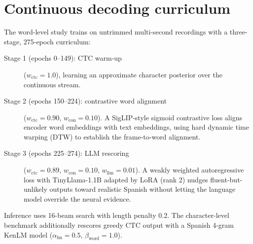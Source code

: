 \documentclass[11pt,a4paper]{report}
\begin{document}
\section{Continuous decoding curriculum}
\label{sec:curriculum}
The word-level study trains on untrimmed multi-second recordings with a
three-stage, 275-epoch curriculum:

\begin{description}
  \item[Stage 1 (epochs 0--149): CTC warm-up] ($w_{\mathrm{ctc}}=1.0$),
  learning an approximate character posterior over the continuous stream.
  \item[Stage 2 (epochs 150--224): contrastive word alignment]
  ($w_{\mathrm{ctc}}=0.90$, $w_{\mathrm{con}}=0.10$). A SigLIP-style sigmoid
  contrastive loss \citep{zhai2023siglip} aligns encoder word embeddings with
  text embeddings, using hard dynamic time warping (DTW) to establish the
  frame-to-word alignment.
  \item[Stage 3 (epochs 225--274): LLM rescoring]
  ($w_{\mathrm{ctc}}=0.89$, $w_{\mathrm{con}}=0.10$, $w_{\mathrm{llm}}=0.01$).
  A weakly weighted autoregressive loss with TinyLlama-1.1B
  \citep{zhang2024tinyllama} adapted by LoRA \citep{hu2021lora} (rank 2)
  nudges fluent-but-unlikely outputs toward realistic Spanish without letting
  the language model override the neural evidence.
\end{description}

Inference uses 16-beam search with length penalty 0.2. The character-level
benchmark additionally rescores greedy CTC output with a Spanish 4-gram
KenLM model \citep{heafield2011kenlm} ($\alpha_{\mathrm{lm}}=0.5$,
$\beta_{\mathrm{word}}=1.0$).
\end{document}

